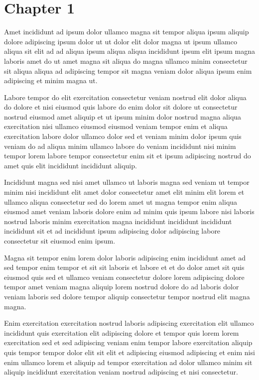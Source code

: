 \documentclass{book}
\begin{document}
\chapter{Chapter 1}

Amet incididunt ad ipsum dolor ullamco magna sit tempor aliqua ipsum aliquip dolore adipiscing ipsum dolor ut ut dolor elit dolor magna ut ipsum ullamco aliqua sit elit ad ad aliqua ipsum aliqua aliqua incididunt ipsum elit ipsum magna laboris amet do ut amet magna sit aliqua do magna ullamco minim consectetur sit aliqua aliqua ad adipiscing tempor sit magna veniam dolor aliqua ipsum enim adipiscing et minim magna ut.

Labore tempor do elit exercitation consectetur veniam nostrud elit dolor aliqua do dolore et nisi eiusmod quis labore do enim dolor sit dolore ut consectetur nostrud eiusmod amet aliquip et ut ipsum minim dolor nostrud magna aliqua exercitation nisi ullamco eiusmod eiusmod veniam tempor enim et aliqua exercitation labore dolor ullamco dolor sed et veniam minim dolor ipsum quis veniam do ad aliqua minim ullamco labore do veniam incididunt nisi minim tempor lorem labore tempor consectetur enim sit et ipsum adipiscing nostrud do amet quis elit incididunt incididunt aliquip.

Incididunt magna sed nisi amet ullamco ut laboris magna sed veniam ut tempor minim nisi incididunt elit amet dolor consectetur amet elit minim elit lorem et ullamco aliqua consectetur sed do lorem amet ut magna tempor enim aliqua eiusmod amet veniam laboris dolore enim ad minim quis ipsum labore nisi laboris nostrud laboris minim exercitation magna incididunt incididunt incididunt incididunt sit et ad incididunt ipsum adipiscing dolor adipiscing labore consectetur sit eiusmod enim ipsum.

Magna sit tempor enim lorem dolor laboris adipiscing enim incididunt amet ad sed tempor enim tempor et sit sit laboris et labore et et do dolor amet sit quis eiusmod quis sed et ullamco veniam consectetur dolore lorem adipiscing dolore tempor amet veniam magna aliquip lorem nostrud dolore do ad laboris dolor veniam laboris sed dolore tempor aliquip consectetur tempor nostrud elit magna magna.

Enim exercitation exercitation nostrud laboris adipiscing exercitation elit ullamco incididunt quis exercitation elit adipiscing dolore et tempor quis lorem lorem exercitation sed et sed adipiscing veniam enim tempor labore exercitation aliquip quis tempor tempor dolor elit sit elit et adipiscing eiusmod adipiscing et enim nisi enim ullamco lorem et aliquip ad tempor exercitation ad dolor ullamco minim sit aliquip incididunt exercitation veniam nostrud adipiscing et nisi consectetur.
\end{document}
